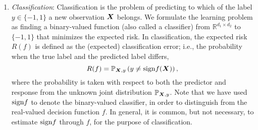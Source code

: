 \documentclass[mathptm]{statsoc}
\def\sign{\textup{sign}}
\begin{document}
\begin{enumerate}[wide, labelwidth=!, labelindent=0pt]
\item {\it Classification}: Classification is the problem of predicting to which of the label $y\in \{-1,1\}$ a new observation $\bm X$ belongs. We formulate the learning problem as finding a binary-valued function (also called a classifier) from $\mathbb{R}^{d_1\times d_2}$ to $\{-1,1\}$ that minimizes the expected risk. In classification, the expected risk $R(f)$ is defined as the (expected) classification error; i.e., the probability when the true label and the predicted label differs,
\[
R(f) = \mathbb{P}_{\mX,y}\left(y\neq \sign f(\mX)\right),
\]
where the probability is taken with respect to both the predictor and response from the unknown joint distribution $\mathbb{P}_{\bm X,y}$.  
Note that we have used $\sign f$ to denote the binary-valued classifier, in order to distinguish from the real-valued decision function $f$. In general, it is common, but not necessary, to estimate $\sign f$ through $f$, for the purpose of classification. 




\end{enumerate}
\end{document}
